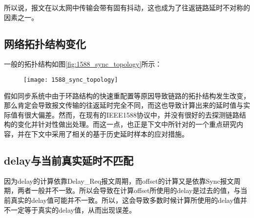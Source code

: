 所以说，报文在以太网中传输会带有固有抖动，这也成为了往返链路延时不对称的因素之一。

\subsection{网络拓扑结构变化}
一般的拓扑结构如图\ref{fig:1588_sync_topology}所示\supercite{2}：

\begin{figure}[!hbp]
  \centering
  \begin{minipage}[b]{0.6\textwidth}
    \captionstyle{\centering}
    \centering
    \texttt{[image: 1588\_sync\_topology]}
  \end{minipage}     
\end{figure}

假如同步系统中由于环路结构的快速重配置等原因导致链路的拓扑结构发生改变，那么肯定会导致报文传输的往返延时完全不同，而这也导致计算出来的延时值与实际值有很大偏差。然而，在现有的IEEE1588协议中，并没有很好的去探测链路结构的变化并针对性做出处理。而这一点，也正是下文中所针对的一个重点研究内容，并在下文中采用了相关的基于历史延时样本的应对措施。

\subsection{delay与当前真实延时不匹配}
因为delay的计算依靠Delay\_Req报文周期，而offset的计算又是依靠Sync报文周期，两者一般并不一致。所以会导致在计算offset所使用的delay是过去的值，与当前真实的delay值可能并不一致。所以，这会导致多数时候计算所使用的delay值并不一定等于真实的delay值，从而出现误差。


